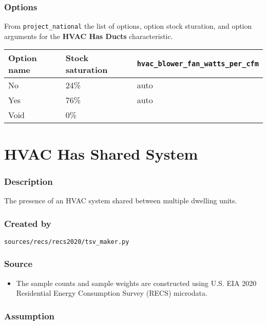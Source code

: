 \subsubsection{Options}\label{options-67}

From \texttt{project\_national} the list of options, option stock
sturation, and option arguments for the \textbf{HVAC Has Ducts}
characteristic.

\begin{longtable}[]{@{}lll@{}}
\toprule\noalign{}
Option name & Stock saturation &
\texttt{hvac\_blower\_fan\_watts\_per\_cfm} \\
\midrule\noalign{}
\endhead
\bottomrule\noalign{}
\endlastfoot
No & 24\% & auto \\
Yes & 76\% & auto \\
Void & 0\% & \\
\end{longtable}

\section{HVAC Has Shared System}\label{hvac_has_shared_system}

\subsubsection{Description}\label{description-68}

The presence of an HVAC system shared between multiple dwelling units.

\subsubsection{Created by}\label{created-by-68}

\texttt{sources/recs/recs2020/tsv\_maker.py}

\subsubsection{Source}\label{source-67}

\begin{itemize}
 
\item
  The sample counts and sample weights are constructed using U.S. EIA
  2020 Residential Energy Consumption Survey (RECS) microdata.
\end{itemize}

\subsubsection{Assumption}\label{assumption-40}

